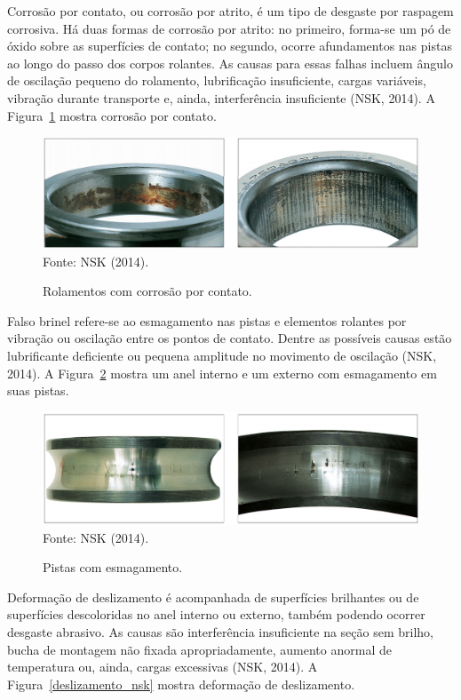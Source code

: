 \documentclass[
	12pt,				
	oneside,			
	a4paper,			
	english,			
	brazil,	
	sumario=abnt-6027-2012		
	]{abntex2ppgsi}
\begin{document}
Corrosão por contato, ou corrosão por atrito, é um tipo de desgaste por raspagem corrosiva. Há duas formas de corrosão por atrito: no primeiro, forma-se um pó de óxido sobre as superfícies de contato; no segundo, ocorre afundamentos nas pistas ao longo do passo dos corpos rolantes. As causas para essas falhas incluem ângulo de oscilação pequeno do rolamento, lubrificação insuficiente, cargas variáveis, vibração durante transporte e, ainda, interferência insuficiente (NSK, 2014). A Figura~\ref{corrosao_nsk} mostra corrosão por contato.

\begin{figure}[H]
\centering
\caption {Rolamentos com corrosão por contato.}
\includegraphics[width=\textwidth,height=\textheight,keepaspectratio]{corrosao_nsk} \\
Fonte: NSK (2014).
\label{corrosao_nsk}
\end{figure}

Falso brinel refere-se ao esmagamento nas pistas e elementos rolantes por vibração ou oscilação entre os pontos de contato. Dentre as possíveis causas estão lubrificante deficiente ou pequena amplitude no movimento de oscilação (NSK, 2014). A Figura~\ref{esmagamento_nsk} mostra um anel interno e um externo com esmagamento em suas pistas.

\begin{figure}[H]
\centering
\caption {Pistas com esmagamento.}
\includegraphics[width=\textwidth,height=\textheight,keepaspectratio]{esmagamento_nsk} \\
Fonte: NSK (2014).
\label{esmagamento_nsk}
\end{figure}

Deformação de deslizamento é acompanhada de superfícies brilhantes ou de superfícies descoloridas no anel interno ou externo, também podendo ocorrer desgaste abrasivo. As causas são interferência insuficiente na seção sem brilho, bucha de montagem não fixada apropriadamente, aumento anormal de temperatura ou, ainda, cargas excessivas (NSK, 2014). A Figura~\ref{deslizamento_nsk} mostra deformação de deslizamento.
\end{document}
